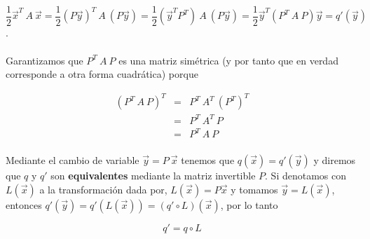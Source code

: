 \begin{equation*}
    \frac{1}{2}\overrightarrow{x}^{T}~A~\overrightarrow{x} = \frac{1}{2}\left(P\overrightarrow{y}\right)^{T}~A~\left(P\overrightarrow{y}\right) = \frac{1}{2}\left(\overrightarrow{y}^{T} P^{T}\right)~A~\left(P\overrightarrow{y}\right) = \frac{1}{2}\overrightarrow{y}^{T}\left(P^{T}~A~P\right)\overrightarrow{y} = 
    q'(\overrightarrow{y})
\end{equation*}.

\paragraph*{}
Garantizamos que $P^{T}~A~P$ es una matriz simétrica (y por tanto que en verdad corresponde a otra forma cuadrática) porque

\begin{eqnarray*}
\left(P^{T}~A~P\right)^{T}&=&P^{T}~A^{T}~\left(P^{T}\right)^{T}\\
&=&P^{T}~A^{T}~P\\
&=&P^{T}~A~P
\end{eqnarray*}

\paragraph*{}
Mediante el cambio de variable $\overrightarrow{y} = P~\overrightarrow{x}$ tenemos que $q(\overrightarrow{x}) = q'(\overrightarrow{y})$ y diremos que $q$ y $q'$ son \textbf{equivalentes} mediante la matriz invertible $P$. Si denotamos con $L(\overrightarrow{x})$ a la transformación dada por, $L(\overrightarrow{x}) = P\overrightarrow{x}$ y tomamos $\overrightarrow{y} = L(\overrightarrow{x})$, entonces $q'(\overrightarrow{y}) = q'\left(L(\overrightarrow{x})\right) = \left(q' \circ L\right)(\overrightarrow{x})$, por lo tanto

\begin{equation*}
q' = q \circ L
\end{equation*}

